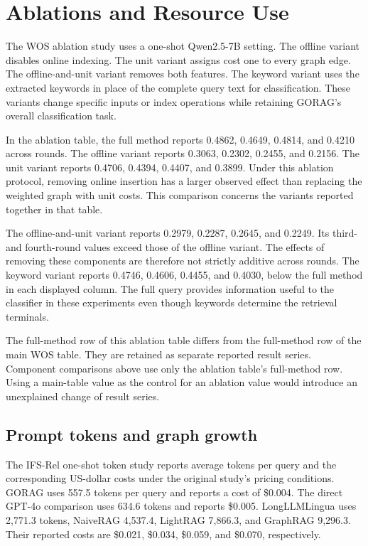 \section{Ablations and Resource Use}
\label{sec:gorag:ablations}

The WOS ablation study uses a one-shot Qwen2.5-7B setting. The offline variant disables online indexing. The unit variant assigns cost one to every graph edge. The offline-and-unit variant removes both features. The keyword variant uses the extracted keywords in place of the complete query text for classification. These variants change specific inputs or index operations while retaining GORAG's overall classification task.



In the ablation table, the full method reports 0.4862, 0.4649, 0.4814, and 0.4210 across rounds. The offline variant reports 0.3063, 0.2302, 0.2455, and 0.2156. The unit variant reports 0.4706, 0.4394, 0.4407, and 0.3899. Under this ablation protocol, removing online insertion has a larger observed effect than replacing the weighted graph with unit costs. This comparison concerns the variants reported together in that table.

The offline-and-unit variant reports 0.2979, 0.2287, 0.2645, and 0.2249. Its third- and fourth-round values exceed those of the offline variant. The effects of removing these components are therefore not strictly additive across rounds. The keyword variant reports 0.4746, 0.4606, 0.4455, and 0.4030, below the full method in each displayed column. The full query provides information useful to the classifier in these experiments even though keywords determine the retrieval terminals.

The full-method row of this ablation table differs from the full-method row of the main WOS table. They are retained as separate reported result series. Component comparisons above use only the ablation table's full-method row. Using a main-table value as the control for an ablation value would introduce an unexplained change of result series.

\subsection{Prompt tokens and graph growth}
\label{sec:gorag:resources}

The IFS-Rel one-shot token study reports average tokens per query and the corresponding US-dollar costs under the original study's pricing conditions. GORAG uses 557.5 tokens per query and reports a cost of \$0.004. The direct GPT-4o comparison uses 634.6 tokens and reports \$0.005. LongLLMLingua uses 2,771.3 tokens, NaiveRAG 4,537.4, LightRAG 7,866.3, and GraphRAG 9,296.3. Their reported costs are \$0.021, \$0.034, \$0.059, and \$0.070, respectively.

